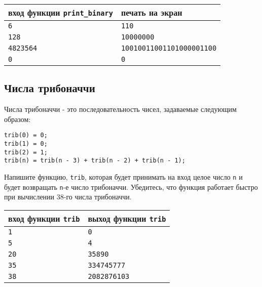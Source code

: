 \documentclass[10pt]{article}
\begin{document}
\begin{center}
\begin{tabular}{ l | l }
 вход функции \texttt{print\_binary} & печать на экран \\ \hline
 \texttt{6} & \texttt{110}  \\
 \texttt{128} & \texttt{10000000}  \\  
 \texttt{4823564} & \texttt{10010011001101000001100}  \\
 \texttt{0} & \texttt{0}  \\
\end{tabular}
\end{center} 
 
 
\subsection{Числа трибоначчи}
Числа трибоначчи - это последовательность чисел, задаваемые следующим образом:
\begin{verbatim}
trib(0) = 0; 
trib(1) = 0; 
trib(2) = 1;
trib(n) = trib(n - 3) + trib(n - 2) + trib(n - 1);
\end{verbatim}
Напишите функцию, \texttt{trib}, которая будет принимать на вход целое число \texttt{n} и будет возвращать \texttt{n}-е число трибоначчи. Убедитесь, что функция работает быстро при вычислении 38-го числа трибоначчи.

\begin{center}
\begin{tabular}{ l | l }
 вход функции \texttt{trib} & выход функции \texttt{trib} \\ \hline
 \texttt{1} & \texttt{0}  \\
 \texttt{5} & \texttt{4}  \\
 \texttt{20} & \texttt{35890}  \\
 \texttt{35} & \texttt{334745777}  \\
 \texttt{38} & \texttt{2082876103}  \\
\end{tabular}
\end{center} 
 
 
\end{document}
